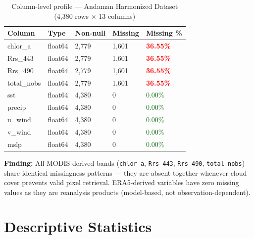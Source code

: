 \documentclass[12pt,a4paper]{report}
\begin{document}
\begin{table}[H]
\centering
\caption{Column-level profile — Andaman Harmonized Dataset (4,380 rows $\times$ 13 columns)}
\begin{tabular}{L{4.5cm}C{2cm}R{1.8cm}R{1.8cm}R{2cm}}
\toprule
\textbf{Column} & \textbf{Type} & \textbf{Non-null} & \textbf{Missing} & \textbf{Missing \%} \\
\midrule
{}
chlor\_a & float64 & 2,779 & 1,601 & \textcolor{red}{\textbf{36.55\%}} \\
Rrs\_443 & float64 & 2,779 & 1,601 & \textcolor{red}{\textbf{36.55\%}} \\
Rrs\_490 & float64 & 2,779 & 1,601 & \textcolor{red}{\textbf{36.55\%}} \\
total\_nobs & float64 & 2,779 & 1,601 & \textcolor{red}{\textbf{36.55\%}} \\
sst & float64 & 4,380 & 0 & \textcolor{darkgreen}{0.00\%} \\
precip & float64 & 4,380 & 0 & \textcolor{darkgreen}{0.00\%} \\
u\_wind & float64 & 4,380 & 0 & \textcolor{darkgreen}{0.00\%} \\
v\_wind & float64 & 4,380 & 0 & \textcolor{darkgreen}{0.00\%} \\
mslp & float64 & 4,380 & 0 & \textcolor{darkgreen}{0.00\%} \\
\bottomrule
\end{tabular}
\label{tab:profile_harm}
\end{table}

\begin{findingbox}
\textbf{Finding:} All MODIS-derived bands (\texttt{chlor\_a}, \texttt{Rrs\_443},
\texttt{Rrs\_490}, \texttt{total\_nobs}) share identical missingness patterns — they are
absent together whenever cloud cover prevents valid pixel retrieval. ERA5-derived variables
have zero missing values as they are reanalysis products (model-based, not observation-dependent).
\end{findingbox}

\section{Descriptive Statistics}
\end{document}
